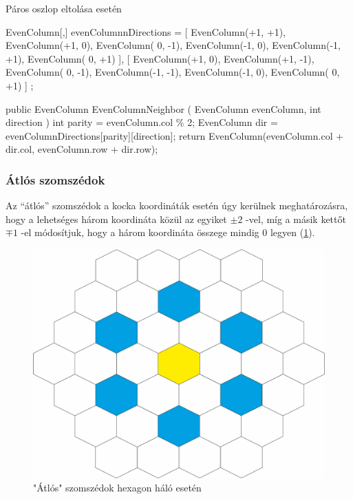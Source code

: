 Páros oszlop eltolása esetén
\begin{cpp}
EvenColumn[,] evenColumnnDirections = 
{ 
   [ 
      EvenColumn(+1, +1), EvenColumn(+1,  0), EvenColumn( 0, -1),
      EvenColumn(-1,  0), EvenColumn(-1, +1), EvenColumn( 0, +1) 
   ],
   [  
      EvenColumn(+1,  0), EvenColumn(+1, -1), EvenColumn( 0, -1),
      EvenColumn(-1, -1), EvenColumn(-1,  0), EvenColumn( 0, +1) 
   ]
};

public EvenColumn EvenColumnNeighbor
(
   EvenColumn evenColumn, 
   int direction
)
{
   int parity = evenColumn.col \% 2;
   EvenColumn dir = evenColumnDirections[parity][direction];
   return EvenColumn(evenColumn.col + dir.col, evenColumn.row + dir.row);
}   
\end{cpp}

\subsubsection{Átlós szomszédok}
\cite{redblobgamesHexagonalGrids}

\noindent Az “átlós” szomszédok a kocka koordináták esetén úgy kerülnek meghatározásra, hogy a lehetséges három koordináta közül az egyiket $ \pm 2$ -vel, míg a másik kettőt $\mp 1$ -el módosítjuk, hogy a három koordináta összege mindig $0$ legyen (\ref{fig:Diagonals}).

\begin{figure}[h!]
\centering
\includegraphics[scale=0.3]{kepek/Diagonals.jpg}
\caption{"Átlós" szomszédok hexagon háló esetén}
\label{fig:Diagonals}
\end{figure}

